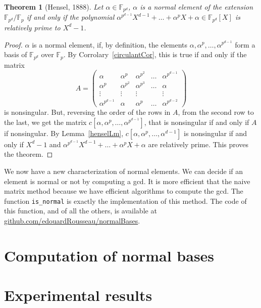\documentclass[a4paper,11pt]{article}
\theoremstyle{break}
\newtheorem{thm}{Theorem}[section]
\theoremstyle{sc}
\theoremstyle{definition}
\theoremstyle{remark}
\begin{document}
\begin{thm}[Hensel, 1888]
  \label{hensel}
  Let $\alpha\in\mathbb{F}_{p^d}$, $\alpha$ is a normal element of the
  extension $\mathbb{F}_{p^d}/\mathbb{F}_p$ if and only if the polynomial
  $\alpha^{p^{d-1}}X^{d-1}+\dots+\alpha^pX+\alpha\in\mathbb{F}_{p^d}[X]$ 
  is relatively prime to $X^d-1$.
\end{thm}
\begin{proof}
  $\alpha$ is a normal element, if, by definition, the elements $\alpha,
  \alpha^p, \dots, \alpha^{p^{d-1}}$ form a basis of
  $\mathbb{F}_{p^d}$ over $\mathbb{F}_p$. By
  Corrolary~\ref{circulantCor}, this is
  true if and only if the matrix
  \[
    A =
    \begin{pmatrix}
      \alpha & \alpha^p & \alpha^{p^2} & \dots & \alpha^{p^{d-1}} \\
      \alpha^p & \alpha^{p^2} & \alpha^{p^3} & \dots & \alpha \\
      \vdots & \vdots & \vdots & & \vdots \\
      \alpha^{p^{d-1}} & \alpha & \alpha^p & \dots & \alpha^{p^{d-2}}
    \end{pmatrix}
  \]
  is nonsingular. But, reversing the order of the rows in $A$, from the second
  row to the last, we get the matrix $c[\alpha, \alpha^p, \dots,
  \alpha^{p^{d-1}}]$, that is nonsingular if and only if $A$ if
  nonsingular. By Lemma~\ref{henselLm}, $c[\alpha, \alpha^p, \dots,
  \alpha^{d-1}]$ is nonsingular if and only if $X^d-1$ and
  $\alpha^{p^{d-1}}X^{d-1}+\dots+\alpha^pX+\alpha$ are relatively prime.
  This proves the theorem.
\end{proof}
We now have a new characterization of normal elements. We can decide if an
element is normal or not by computing a gcd. It is more efficient that the
naive matrix method because we have efficient algorithms to compute the gcd.
The function \texttt{is\_normal} is exactly the implementation of this
method. The code of this function, and of all the others, is available at
\url{github.com/edouardRousseau/normalBases}.

\section{Computation of normal bases}

\section{Experimental results}

\clearpage


\end{document}

